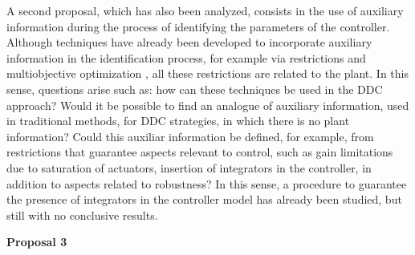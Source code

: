 A second proposal, which has also been analyzed, consists in the use of auxiliary information during the process of identifying the parameters of the controller.
Although techniques have already been developed to incorporate auxiliary information in the identification process, for example via restrictions and multiobjective optimization \citep{barroso2006}, all these restrictions are related to the plant.
In this sense, questions arise such as: how can these techniques be used in the DDC approach?
Would it be possible to find an analogue of auxiliary information, used in traditional methods, for DDC strategies, in which there is no plant information?
Could this auxiliar information be defined, for example, from restrictions that guarantee aspects relevant to control, such as gain limitations due to saturation of actuators, insertion of integrators in the controller, in addition to aspects related to robustness? In this sense, a procedure to guarantee the presence of integrators in the controller model has already been studied, but still with no conclusive results.

\medskip
\textbf{Proposal 3} 

